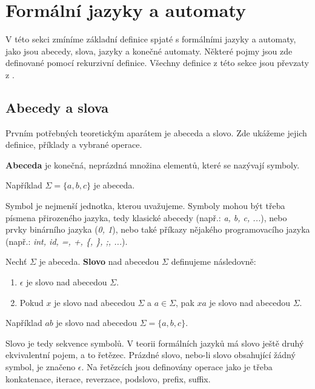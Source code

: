 \section{Formální jazyky a automaty}

V této sekci zmíníme základní definice spjaté s formálními jazyky a automaty, jako jsou abecedy, slova, jazyky a konečné automaty. Některé pojmy jsou zde definované pomocí rekurzivní definice. Všechny definice z této sekce jsou převzaty z \cite{meduna_book}.

\subsection{Abecedy a slova}

Prvním potřebných teoretickým aparátem je abeceda a slovo. Zde ukážeme jejich definice, příklady a vybrané operace.

\begin{definition}
    \textbf{Abeceda} je konečná, neprázdná množina elementů, které se nazývají symboly.
\end{definition}

\begin{example}
    Například $\Sigma = \{a,b,c\}$ je abeceda.
\end{example}

Symbol je nejmenší jednotka, kterou uvažujeme. Symboly mohou být třeba písmena přirozeného jazyka, tedy klasické abecedy (např.: \textit{a, b, c, ...}), nebo prvky binárního jazyka (\textit{0, 1}), nebo také příkazy nějakého programovacího jazyka (např.: \textit{int, id, =, +, \{, \}, ;, ...}).

\begin{definition}
    Nechť $\Sigma$ je abeceda. \textbf{Slovo} nad abecedou $\Sigma$ definujeme následovně:
    \begin{enumerate}
        \item $\epsilon$ je slovo nad abecedou $\Sigma$.
        \item Pokud $x$ je slovo nad abecedou $\Sigma$ a $a \in \Sigma$, pak $xa$ je slovo nad abecedou $\Sigma$.
    \end{enumerate}
\end{definition}

\begin{example}
    Například $ab$ je slovo nad abecedou $\Sigma=\{a,b,c\}$.
\end{example}

Slovo je tedy sekvence symbolů. V teorii formálních jazyků má slovo ještě druhý ekvivalentní pojem, a to řetězec. Prázdné slovo, nebo-li slovo obsahující žádný symbol, je značeno $\epsilon$. Na řetězcích jsou definovány operace jako je třeba konkatenace, iterace, reverzace, podslovo, prefix, suffix.

